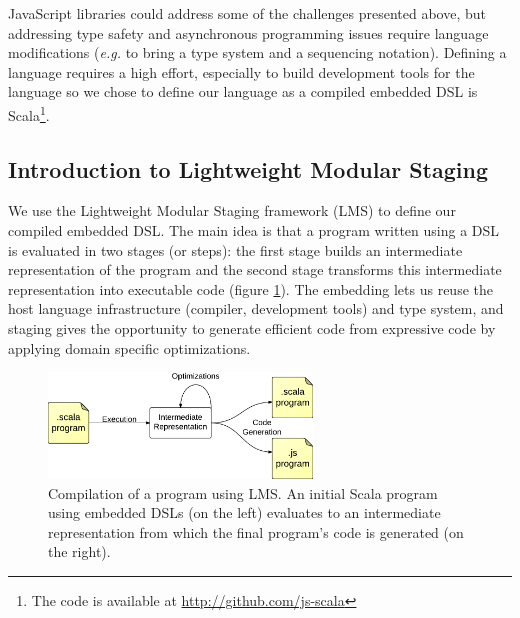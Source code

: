 \documentclass[american,english,runningheads]{llncs}
\newcommand{\eg}{\emph{e.g.}}
\begin{document}
JavaScript libraries could address some of the challenges presented above, but addressing type safety and asynchronous programming issues require language modifications (\eg{} to bring a type system and a sequencing notation). Defining a language requires a high effort, especially to build development tools for the language so we chose to define our language as a compiled embedded DSL is Scala\footnote{The code is available at \href{http://github.com/js-scala}{http://github.com/js-scala}}.

\subsection{Introduction to Lightweight Modular Staging}
\label{intro-lms}

We use the Lightweight Modular Staging framework (LMS) to define our compiled embedded DSL. The main idea is that a program written using a DSL is evaluated in two stages (or steps): the first stage builds an intermediate representation of the program and the second stage transforms this intermediate representation into executable code (figure \ref{lms-diagram}). The embedding lets us reuse the host language infrastructure (compiler, development tools) and type system, and staging gives the opportunity to generate efficient code from expressive code by applying domain specific optimizations.

\begin{figure}
  \centering
  \includegraphics[width=7cm]{lms.pdf}
  \caption{Compilation of a program using LMS. An initial Scala program using embedded DSLs (on the left) evaluates to an intermediate representation from which the final program’s code is generated (on the right).}
  \label{lms-diagram}
\end{figure}
\end{document}
